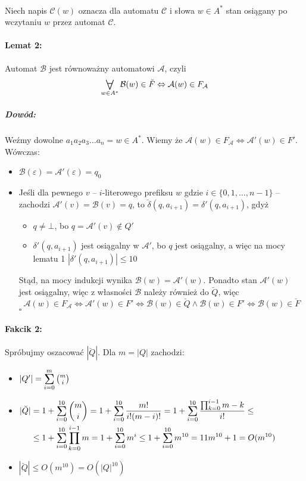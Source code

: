 \documentclass[12pt]{article}
\newcommand*{\Autom}{\mathcal{A}}
\newcommand{\bigany}{%
	\mathop{\lower0.75ex\hbox{%
			   \scalebox{1.7}{\ensuremath{\forall}}}}\limits}
\newcommand{\bigsum}{%
	\mathop{\lower0.75ex\hbox{%
			   \scalebox{1.7}{\ensuremath{\Sigma}}}}\limits}
\newcommand*{\QEDB}{\hfill\ensuremath{\square}}%
\begin{document}
\paragraph{}
Niech napis $\mathcal{C}(w)$ oznacza dla automatu $\mathcal{C}$ i słowa $w \in A^*$ stan osiągany
po wczytaniu $w$ przez automat $\mathcal{C}$.

\clearpage 

\paragraph{Lemat 2:}
Automat $\mathcal{B}$ jest równoważny automatowi $\Autom$, czyli
$${\bigany_{w \in A^*} \mathcal{B}(w) \in \breve F \Leftrightarrow \Autom(w) \in F_\Autom}$$
\subparagraph{Dowód:}
Weźmy dowolne $a_1 a_2 a_3 \dots a_n = w \in A^*$. Wiemy że
${\Autom(w) \in F_\Autom \Leftrightarrow \Autom'(w) \in F'}$. Wówczas:

\begin{itemize}
  \item $\mathcal{B}(\varepsilon) = \Autom'(\varepsilon) = q_0$
  \item Jeśli dla pewnego $v$ – $i$-literowego prefiksu $w$ gdzie $i \in \{0, 1, \dots, n-1\}$ –
	  zachodzi $\Autom'(v) = \mathcal{B}(v) = q$, to
	  $\breve\delta(q, a_{i+1}) = \delta'(q, a_{i+1})$, gdyż
  \begin{itemize}
    \item $q \neq \bot$, bo $q = \Autom'(v) \notin Q'$
    \item $\delta'(q, a_{i+1})$ jest osiągalny w $\Autom'$, bo $q$ jest osiągalny, a więc na mocy 
	    lematu 1 $|\delta'(q, a_{i+1})| \leq 10$
  \end{itemize}
  Stąd, na mocy indukcji wynika $\mathcal{B}(w) = \Autom'(w)$. Ponadto stan $\Autom'(w)$ jest
  osiągalny, więc z własności $\mathcal{B}$ należy również do $\breve Q$, więc
$$\Autom(w) \in F_\Autom \Leftrightarrow \Autom'(w) \in F' \Leftrightarrow \mathcal{B}(w) \in
\breve Q \land \mathcal{B}(w) \in F' \Leftrightarrow \mathcal{B}(w) \in \breve F$$
\QEDB
\end{itemize}

\paragraph{Fakcik 2:}
Spróbujmy oszacować $|\breve Q|$. Dla $m = |Q|$ zachodzi:
\begin{itemize}
  \item $|Q'| = \bigsum_{i=0}^{m} \binom{m}{i}$
  \item $
    \begin{aligned}[t]
	  |\breve Q| &= 1 + \bigsum_{i=0}^{10} \binom{m}{i} =
	  1 + \bigsum_{i=0}^{10} \frac{m!}{i!(m-i)!} =
	  1 + \bigsum_{i=0}^{10} \frac{\prod_{k=0}^{i-1}m-k}{i!} \leq \\ &\leq
	  1 + \bigsum_{i=0}^{10} \prod_{k=0}^{i-1}m = 1 + \bigsum_{i=0}^{10} m^{i} \leq
	  1 + \bigsum_{i=0}^{10} m^{10} = 11m^{10} + 1 = O(m^{10})
    \end{aligned}
  $
  \item $|\breve Q| \leq O(m^{10}) = O(|Q|^{10})$
\end{itemize}
\end{document}
